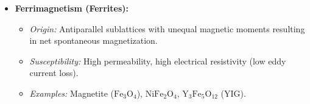 \begin{theorysol}
\begin{itemize}
\begin{itemize}
  \end{itemize}
\item \textbf{Ferrimagnetism (Ferrites):}
  \begin{itemize}
  \item \textit{Origin:} Antiparallel sublattices with unequal magnetic moments resulting in net spontaneous magnetization.
  \item \textit{Susceptibility:} High permeability, high electrical resistivity (low eddy current loss).
  \item \textit{Examples:} Magnetite ($\text{Fe}_3\text{O}_4$), $\text{NiFe}_2\text{O}_4$, $\text{Y}_3\text{Fe}_5\text{O}_{12}$ (YIG).
  \end{itemize}
\end{itemize}
\end{theorysol}
\vspace{4mm}

